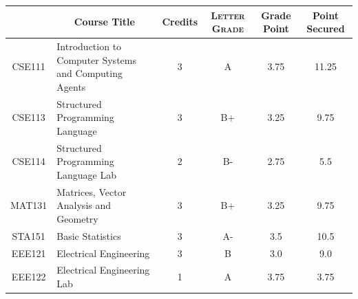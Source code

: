 \documentclass[11pt]{article}
\newcommand*{\numtwo}[1]{\pgfmathprintnumber[
                    fixed, precision=2, fixed zerofill=true]{#1}}
\begin{document}
                \begin{center}
                    \renewcommand{\arraystretch}{1.08}
                    
                \begin{tabular}{|c|l|c|>{\scshape}c|c|c|}
                \hline  \rule[-1ex]{0pt}{3.5ex} {\centering{\bf Course Code}} &  \multicolumn{1}{c|}{\textbf{Course Title}}  & {\bf Credits} & {\bf Letter Grade} & {\bf Grade Point} & {\bf Point Secured}  \\ 
                \hline   CSE111 &  Introduction to Computer Systems and Computing Agents		 & 3 & A & 3.75 & 11.25 \\ %
                \hline   CSE113 &  Structured Programming Language		 & 3 & B+ & 3.25 & 9.75 \\ %
                \hline   CSE114 &  Structured Programming Language Lab		 & 2 & B- & 2.75 & 5.5 \\ %
                \hline   MAT131 &  Matrices, Vector Analysis and Geometry		 & 3 & B+ & 3.25 & 9.75 \\ %
                \hline   STA151 &  Basic Statistics		 & 3 & A- & 3.5 & 10.5 \\ %
                \hline   EEE121 &  Electrical Engineering		 & 3 & B & 3.0 & 9.0 \\ %
                \hline   EEE122 &  Electrical Engineering Lab		 & 1 & A & 3.75 & 3.75 \\ %

\hline                %
                \end{tabular}
                \end{center}
                \renewcommand{\arraystretch}{1.03}
\end{document}
